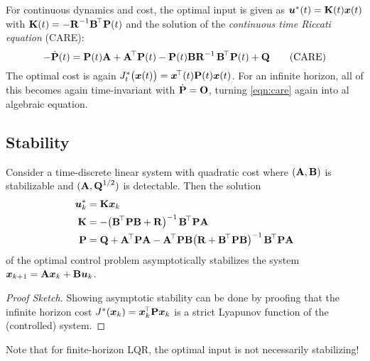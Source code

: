 			For continuous dynamics and cost, the optimal input is given as \( \bm{u}^\ast(t) = \bm{\mathrm{K}}(t) \bm{x}(t) \) with \( \bm{\mathrm{K}}(t) = -\bm{\mathrm{R}}^{-1} \bm{\mathrm{B}}^{\!\top} \bm{\mathrm{P}}(t)\) and the solution of the \emph{continuous time Riccati equation} (CARE):
			\begin{equation}
				-\dot{\bm{\mathrm{P}}}(t) = \bm{\mathrm{P}}(t) \bm{\mathrm{A}} + \bm{\mathrm{A}}^{\!\top} \bm{\mathrm{P}}(t) - \bm{\mathrm{P}}(t) \bm{\mathrm{B}} \bm{\mathrm{R}}^{-1\,} \bm{\mathrm{B}}^{\!\top} \bm{\mathrm{P}}(t) + \bm{\mathrm{Q}}  \tag{CARE}\label{eqn:care}
			\end{equation}
			The optimal cost is again \( J_t^\ast\bigl(\bm{x}(t)\bigr) = \bm{x}^{\!\top}(t) \bm{\mathrm{P}}(t) \bm{x}(t) \). For an infinite horizon, all of this becomes again time-invariant with \( \dot{\bm{\mathrm{P}}} = \bm{\mathrm{O}} \), turning \eqref{eqn:care} again into al algebraic equation.

		\subsection{Stability}
			\begin{theorem}
				Consider a time-discrete linear system with quadratic cost where \( (\bm{\mathrm{A}}, \bm{\mathrm{B}}) \) is stabilizable and \( (\bm{\mathrm{A}}, \bm{\mathrm{Q}}^{1/2}) \) is detectable. Then the solution
				\begin{align}
					\bm{u}_k^\ast &= \bm{\mathrm{K}} \bm{x}_k \\
					\bm{\mathrm{K}} &= -\bigl( \bm{\mathrm{B}}^{\!\top} \bm{\mathrm{P}} \bm{\mathrm{B}} + \bm{\mathrm{R}} \bigr)^{-1\,} \bm{\mathrm{B}}^{\!\top} \bm{\mathrm{P}} \bm{\mathrm{A}} \\
					\bm{\mathrm{P}} &= \bm{\mathrm{Q}} + \bm{\mathrm{A}}^{\!\top} \bm{\mathrm{P}} \bm{\mathrm{A}} - \bm{\mathrm{A}}^{\!\top} \bm{\mathrm{P}} \bm{\mathrm{B}} \bigl( \bm{\mathrm{R}} + \bm{\mathrm{B}}^{\!\top} \bm{\mathrm{P}} \bm{\mathrm{B}} \bigr)^{-1\,} \bm{\mathrm{B}}^{\!\top} \bm{\mathrm{P}} \bm{\mathrm{A}}
				\end{align}
				of the optimal control problem asymptotically stabilizes the system \( \bm{x}_{k + 1} = \bm{\mathrm{A}} \bm{x}_k + \bm{\mathrm{B}} \bm{u}_k \).
			\end{theorem}
			\begin{proof}[Proof Sketch]
				Showing asymptotic stability can be done by proofing that the infinite horizon cost \( J^\ast(\bm{x}_k) = \bm{x}_k^{\!\top} \bm{\mathrm{P}} \bm{x}_k \) is a strict Lyapunov function of the (controlled) system.
			\end{proof}

			Note that for finite-horizon LQR, the optimal input is not necessarily stabilizing!

